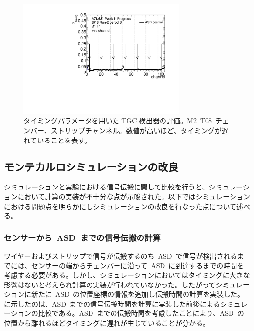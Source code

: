 \begin{figure}[tbp]
        \centering   
        \includegraphics[width=0.75\textwidth,page=21]{img/pdf5/master_timingplot_data.pdf}
        \caption[タイミングパラメータを用いた TGC 検出器の評価]{タイミングパラメータを用いた TGC 検出器の評価。M2~T08~チェンバー、ストリップチャンネル。数値が高いほど、タイミングが遅れていることを表す。}
        \label{fig:timingex}
\end{figure}

\subsection{モンテカルロシミュレーションの改良}
\label{sec:imp}
シミュレーションと実験における信号伝搬に関して比較を行うと、シミュレーションにおいて計算の実装が不十分な点が示唆された。以下ではシミュレーションにおける問題点を明らかにしシミュレーションの改良を行なった点について述べる。

\subsubsection{センサーから~ASD~までの信号伝搬の計算}
ワイヤーおよびストリップで信号が伝搬するのち~ASD~で信号が検出されるまでには、センサーの端からチェンバーに沿って~ASD~に到達するまでの時間を考慮する必要がある。しかし、シミュレーションにおいてはタイミングに大きな影響はないと考えられ計算の実装が行われていなかった。したがってシミュレーションに新たに~ASD~の位置座標の情報を追加し伝搬時間の計算を実装した。
に示したのは、ASD~までの信号伝搬時間を計算に実装した前後によるシミュレーションの比較である。ASD~までの伝搬時間を考慮したことにより、ASD~の位置から離れるほどタイミングに遅れが生じていることが分かる。

